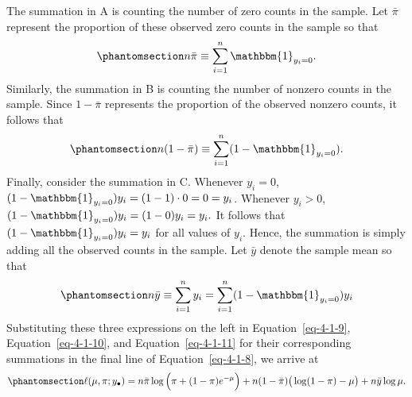 \documentclass[
  12pt]{article}
\begin{document}
The summation in A is counting the number of zero counts in the sample.
Let \(\bar{\pi}\) represent the proportion of these observed zero counts
in the sample so that \begin{equation}\phantomsection\label{eq-4-1-9}{
n\bar{\pi} \equiv \sum_{i=1}^n \mathbbm{1}_{y_i = 0}.
}\end{equation} Similarly, the summation in B is counting the number of
nonzero counts in the sample. Since \(1-\bar{\pi}\) represents the
proportion of the observed nonzero counts, it follows that
\begin{equation}\phantomsection\label{eq-4-1-10}{
n(1-\bar{\pi}) \equiv \sum_{i=1}^n (1-\mathbbm{1}_{y_i = 0}).
}\end{equation} Finally, consider the summation in C. Whenever
\(y_i = 0\), \((1-\mathbbm{1}_{y_i = 0})y_i = (1-1)\cdot 0 = 0 = y_i\).
Whenever \(y_i > 0\), \((1-\mathbbm{1}_{y_i = 0})y_i = (1-0)y_i = y_i.\)
It follows that \((1-\mathbbm{1}_{y_i = 0})y_i = y_i\) for all values of
\(y_i\). Hence, the summation is simply adding all the observed counts
in the sample. Let \(\bar{y}\) denote the sample mean so that
\begin{equation}\phantomsection\label{eq-4-1-11}{
n \bar{y} \equiv \sum_{i=1}^n y_i = \sum_{i=1}^n (1-\mathbbm{1}_{y_i = 0})y_i
}\end{equation} Substituting these three expressions on the left in
Equation~\ref{eq-4-1-9}, Equation~\ref{eq-4-1-10}, and
Equation~\ref{eq-4-1-11} for their corresponding summations in the final
line of Equation~\ref{eq-4-1-8}, we arrive at
\begin{equation}\phantomsection\label{eq-4-1-12}{
\ell(\mu, \pi; y_{\bullet}) = n \bar{\pi}\log\Big(\pi + (1 - \pi)e^{-\mu}\Big) +  n(1-\bar{\pi})\big(\log(1-\pi) - \mu\big) + n\bar{y}\log \mu.
}\end{equation}
\end{document}
